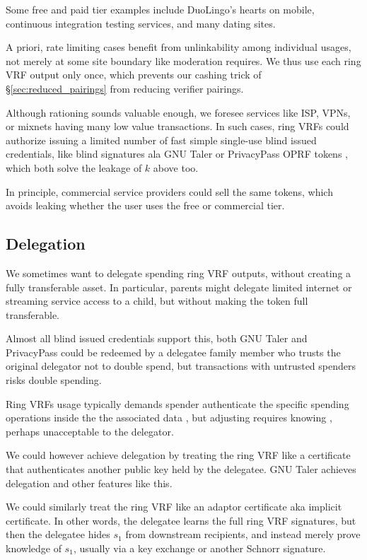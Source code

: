 Some free and paid tier examples include DuoLingo's hearts on mobile, 
continuous integration testing services, and many dating sites.

A priori, rate limiting cases benefit from unlinkability among individual
usages, not merely at some site boundary like moderation requires.
We thus use each ring VRF output only once, which prevents our cashing
trick of \S\ref{sec:reduced_pairings} from reducing verifier pairings.

Although rationing sounds valuable enough, we foresee services like ISP,
VPNs, or mixnets having many low value transactions.
In such cases, ring VRFs could authorize issuing a limited number of
fast simple single-use blind issued credentials, like blind signatures
ala GNU Taler \cite{taler} or PrivacyPass OPRF tokens \cite{PrivacyPass},
 which both solve the leakage of $k$ above too.

In principle, commercial service providers could sell the same tokens,
which avoids leaking whether the user uses the free or commercial tier.


\subsection{Delegation}

We sometimes want to delegate spending ring VRF outputs, without
creating a fully transferable asset.  In particular, parents might
delegate limited internet or streaming service access to a child,
but without making the token full transferable.

Almost all blind issued credentials support this, both
GNU Taler \cite{taler} and PrivacyPass \cite{PrivacyPass} could
be redeemed by a delegatee family member who trusts the original
delegator not to double spend, but transactions with untrusted spenders
risks double spending.  

Ring VRFs usage typically demands spender authenticate the specific
spending operations inside the the associated data \aux, but adjusting
\aux requires knowing \sk, perhaps unacceptable to the delegator.

We could however achieve delegation by treating the ring VRF like a
certificate that authenticates another public key held by the delegatee.
GNU Taler achieves delegation and other features like this.

We could similarly treat the ring VRF like an adaptor certificate aka
implicit certificate.  In other words, the delegatee learns the full
ring VRF signatures, but then the delegatee hides $s_1$ from downstream
recipients, and instead merely prove knowledge of $s_1$, usually via
a key exchange or another Schnorr signature.

